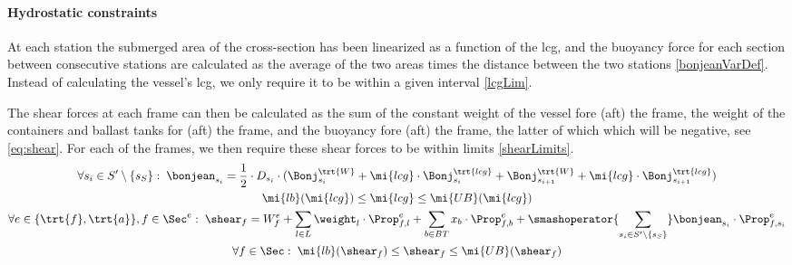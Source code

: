 \paragraph{Hydrostatic constraints}
At each station the submerged area of the cross-section has been linearized as a function of the lcg, and the buoyancy force for each section between consecutive stations are calculated as the average of the two areas times the distance between the two stations \eqref{bonjeanVarDef}. 
Instead of calculating the vessel's lcg, we only require it to be within a given interval \eqref{lcgLim}.

The shear forces at each frame can then be calculated as the sum of the constant weight of the vessel fore (aft) the frame, the weight of the containers and ballast tanks for (aft) the frame, and the buoyancy fore (aft) the frame, the latter of which which will be negative, see \eqref{eq:shear}. For each of the frames, we then require these shear forces to be within limits \eqref{shearLimits}.   
\begin{gather}
\forall s_i \in S'\setminus\{s_S\}:\;
\bonjean_{s_i} = \frac{1}{2}\cdot D_{s_i}\cdot(\Bonj^\trt{W}_{s_i} + \mi{lcg}\cdot \Bonj^\trt{lcg}_{s_i}	+ \Bonj^\trt{W}_{s_{i+1}} + \mi{lcg}\cdot \Bonj^\trt{lcg}_{s_{i+1}})
\label{bonjeanVarDef}\\
%
\mi{lb}(\mi{lcg}) \leq \mi{lcg} \leq \mi{UB}(\mi{lcg})
\label{lcgLim}\\
%
\forall {e}\in\{\trt{f},\trt{a}\}, f \in \Sec^{e}:\;
\shear_f = W^{e}_f+ \sum_{l\in L} \weight_l\cdot \Prop_{f,l}^{e} + \sum_{b \in BT} x_b\cdot \Prop^{e}_{f,b} 	+ \smashoperator{\sum_{s_i \in S'\setminus\{s_S\}}}\bonjean_{s_i}\cdot \Prop^{e}_{f,s_i}
\label{eq:shear}\\
%
\forall f \in \Sec:\;	\mi{lb}(\shear_f)\leq	\shear_f \leq \mi{UB}(\shear_f)
\label{shearLimits}
\end{gather}
%
